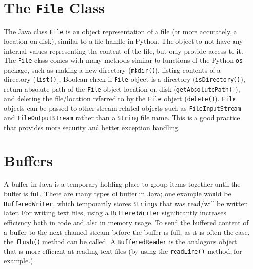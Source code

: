\documentclass{tufte-handout}
\begin{document}
    \section*{The \texttt{File} Class}
    The Java class \texttt{File} is an object representation of a file (or more accurately, a location on disk), similar to a file handle in Python. The object to not have any internal values representing the content of the file, but only provide access to it. The \texttt{File} class comes with many methods similar to functions of the Python \texttt{os} package, such as making a new directory (\texttt{mkdir()}), listing contents of a directory (\texttt{list()}), Boolean check if \texttt{File} object is a directory (\texttt{isDirectory()}), return absolute path of the \texttt{File} object location on disk (\texttt{getAbsolutePath()}), and deleting the file/location referred to by the \texttt{File} object (\texttt{delete()}). \texttt{File} objects can be passed to other stream-related objects such as \texttt{FileInputStream} and \texttt{FileOutputStream} rather than a \texttt{String} file name. This is a good practice that provides more security and better exception handling. 

    \section*{Buffers}
    A buffer in Java is a temporary holding place to group items together until the buffer is full. There are many types of buffer in Java; one example would be \texttt{BufferedWriter}, which temporarily stores \texttt{Strings} that was read/will be written later. For writing text files, using a \texttt{BufferedWriter} significantly increases efficiency both in code and also in memory usage. To send the buffered content of a buffer to the next chained stream before the buffer is full, as it is often the case, the \texttt{flush()} method can be called. A \texttt{BufferedReader} is the analogous object that is more efficient at reading text files (by using the \texttt{readLine()} method, for example.)
\end{document}
